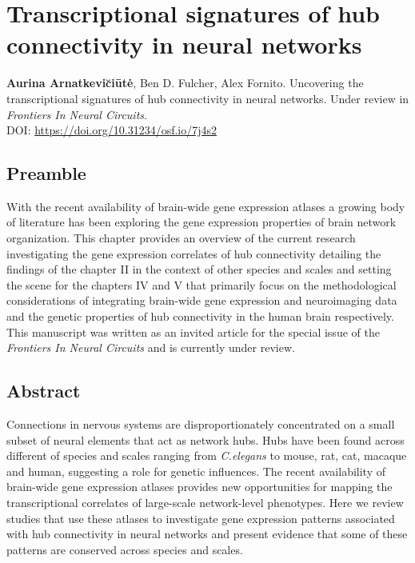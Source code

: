 \chapter{Transcriptional signatures of hub \\connectivity in neural networks}
\label{ch:Chapter3}



\textbf{Aurina Arnatkevi\u{c}i\={u}t\.{e}},
Ben D. Fulcher,
Alex Fornito.
Uncovering the transcriptional signatures of hub connectivity in neural networks. Under review in \textit{
Frontiers In Neural Circuits}.\\
DOI: \url{https://doi.org/10.31234/osf.io/7j4s2} %

\section*{Preamble}
With the recent availability of brain-wide gene expression atlases a growing body of literature has been exploring the gene expression properties of brain network organization. This chapter provides an overview of the current research investigating the gene expression correlates of hub connectivity detailing the findings of the chapter II in the context of other species and scales and setting the scene for the chapters IV and V that primarily focus on the methodological considerations of integrating brain-wide gene expression and neuroimaging data and the genetic properties of hub connectivity in the human brain respectively. This manuscript was written as an invited article for the special issue of the \textit{Frontiers In Neural Circuits} and is currently under review.

\newpage

\section*{Abstract}
Connections in nervous systems are disproportionately concentrated on a small subset of neural elements that act as network hubs. Hubs have been found across different of species and scales ranging from \textit{C.elegans} to mouse, rat, cat, macaque and human, suggesting a role for genetic influences. The recent availability of brain-wide gene expression atlases provides new opportunities for mapping the transcriptional correlates of large-scale network-level phenotypes. Here we review studies that use these atlases to investigate gene expression patterns associated with hub connectivity in neural networks and present evidence that some of these patterns are conserved across species and scales.

